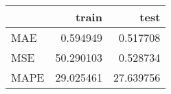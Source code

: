 \begin{tabular}{lrr}
\toprule
{} &      train &       test \\
\midrule
MAE  &   0.594949 &   0.517708 \\
MSE  &  50.290103 &   0.528734 \\
MAPE &  29.025461 &  27.639756 \\
\bottomrule
\end{tabular}
